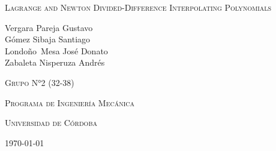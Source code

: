 \documentclass{article}
\begin{document}
\pgfplotsset{compat=1.18}
\begin{titlepage}
    \centering
    \vspace{3cm}
    {\scshape\Large Lagrange and Newton Divided-Difference Interpolating Polynomials\par}
    \vspace{3cm}
    \textbf\large\scshape{\par}
    \vspace{2.5cm}
    {\Large Vergara Pareja Gustavo\\Gómez Sibaja Santiago\\Londoño Mesa José Donato\\Zabaleta Nisperuza Andrés\par}
    \vspace{3cm}
    {\scshape\Large Grupo N°2 (32-38) \par}
    {\scshape\Large Programa de Ingeniería Mecánica \par}
    {\scshape\Large Universidad de Córdoba\par}
    {\Large \today \par}
\end{titlepage}
\end{document}
